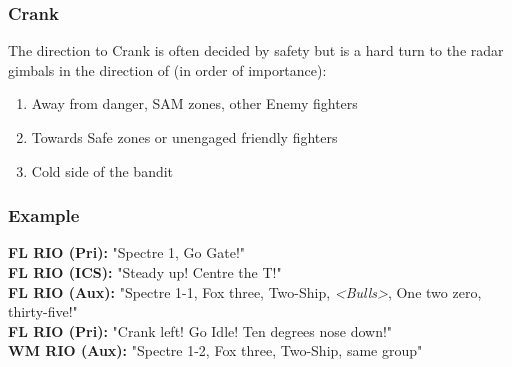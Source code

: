 \subsubsection*{Crank}

The direction to Crank is often decided by safety but is a hard turn to the
radar gimbals in the direction of (in order of importance):

\begin{enumerate}
  \item Away from danger, SAM zones, other Enemy fighters
  \item Towards Safe zones or unengaged friendly fighters
  \item Cold side of the bandit
\end{enumerate}


\subsubsection*{Example}

\textbf{FL RIO (Pri):} "Spectre 1, Go Gate!" \\
\textbf{FL RIO (ICS):} "Steady up! Centre the T!" \\
\textbf{FL RIO (Aux):} "Spectre 1-1, Fox three, Two-Ship,
\textit{<Bulls>}, One two zero,
thirty-five!" \\
\textbf{FL RIO (Pri):} "Crank left! Go Idle! Ten degrees nose down!" \\
\textbf{WM RIO (Aux):} "Spectre 1-2, Fox three, Two-Ship, same group"


